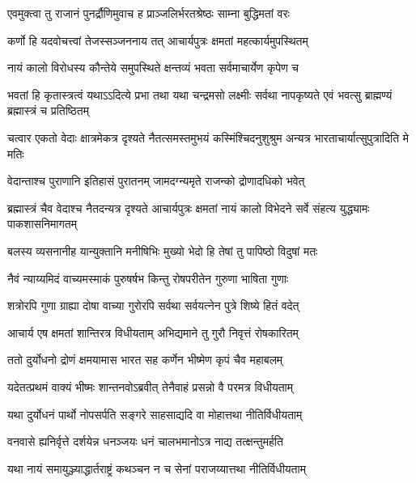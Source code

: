 \twolineshloka
{एवमुक्त्वा तु राजानं पुनर्द्रौणिमुवाच ह}
{प्राञ्जलिर्भरतश्रेष्ठः साम्ना बुद्धिमतां वरः}


\twolineshloka
{कर्णो हि यदवोचत्त्वां तेजस्सञ्जननाय तत्}
{आचार्यपुत्रः क्षमतां महत्कार्यमुपस्थितम्}


\twolineshloka
{नायं कालो विरोधस्य कौन्तेये समुपस्थिते}
{क्षन्तव्यं भवता सर्वमाचार्येण कृपेण च}


\threelineshloka
{भवतां हि कृतास्त्रत्वं यथाऽऽदित्ये प्रभा तथा}
{यथा चन्द्रमसो लक्ष्मीः सर्वथा नापकृष्यते}
{एवं भवत्सु ब्राह्मण्यं ब्रह्मास्त्रं च प्रतिष्ठितम्}


\threelineshloka
{चत्वार एकतो वेदाः क्षात्रमेकत्र दृश्यते}
{नैतत्समस्तमुभयं कस्मिंश्चिदनुशुश्रुम}
{अन्यत्र भारताचार्यात्सुपुत्रादिति मे मतिः}


\twolineshloka
{वेदान्ताश्च पुराणानि इतिहासं पुरातनम्}
{जामदग्न्यमृते राजन्को द्रोणादधिको भवेत्}


\onelineshloka
{ब्रह्मास्त्रं चैव वेदाश्च नैतदन्यत्र दृश्यते}
\twolineshloka
{आचार्यपुत्रः क्षमतां नायं कालो विभेदने}
{सर्वे संहत्य युद्ध्यामः पाकशासनिमागतम्}


\twolineshloka
{बलस्य व्यसनानीह यान्युक्तानि मनीषिभिः}
{मुख्यो भेदो हि तेषां तु पापिष्ठो विदुषां मतः}




\twolineshloka
{नैवं न्याय्यमिदं वाच्यमस्माकं पुरुषर्षभ}
{किन्तु रोषपरीतेन गुरुणा भाषिता गुणाः}


\twolineshloka
{शत्रोरपि गुणा ग्राह्या दोषा वाच्या गुरोरपि}
{सर्वथा सर्वयत्नेन पुत्रे शिष्ये हितं वदेत्}


\twolineshloka
{आचार्य एष क्षमतां शान्तिरत्र विधीयताम्}
{अभिद्यमाने तु गुरौ निवृत्तं रोषकारितम्}



\twolineshloka
{ततो दुर्योधनो द्रोणं क्षमयामास भारत}
{सह कर्णेन भीष्मेण कृपं चैव महाबलम्}




\twolineshloka
{यदेतत्प्रथमं वाक्यं भीष्मः शान्तनवोऽब्रवीत्}
{तेनैवाहं प्रसन्नो वै परमत्र विधीयताम्}


\twolineshloka
{यथा दुर्योधनं पार्थो नोपसर्पति सङ्गरे}
{साहसाद्यदि वा मोहात्तथा नीतिर्विधीयताम्}


\twolineshloka
{वनवासे ह्यनिर्वृत्ते दर्शयेन्न धनञ्जयः}
{धनं चालभमानोऽत्र नाद्य तत्क्षन्तुमर्हति}


\twolineshloka
{यथा नायं समायुञ्ज्याद्धार्तराष्ट्रं कथञ्चन}
{न च सेनां पराजय्यात्तथा नीतिर्विधीयताम्}



